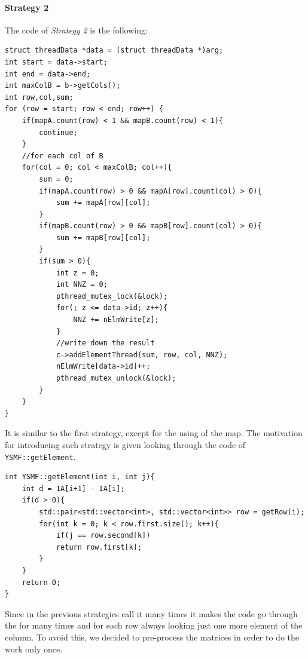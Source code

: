\documentclass[]{article}
\begin{document}
\paragraph{Strategy 2}
The code of \textit{Strategy 2} is the following:
\begin{lstlisting}[style=customc]
struct threadData *data = (struct threadData *)arg;
int start = data->start;
int end = data->end;
int maxColB = b->getCols();
int row,col,sum;
for (row = start; row < end; row++) {
    if(mapA.count(row) < 1 && mapB.count(row) < 1){
        continue;
    }
    //for each col of B
    for(col = 0; col < maxColB; col++){
        sum = 0;
        if(mapA.count(row) > 0 && mapA[row].count(col) > 0){
            sum += mapA[row][col];
        }
        if(mapB.count(row) > 0 && mapB[row].count(col) > 0){
            sum += mapB[row][col];
        }
        if(sum > 0){
            int z = 0;
            int NNZ = 0;
            pthread_mutex_lock(&lock);
            for(; z <= data->id; z++){
                NNZ += nElmWrite[z];
            }
            //write down the result
            c->addElementThread(sum, row, col, NNZ);
            nElmWrite[data->id]++;
            pthread_mutex_unlock(&lock);
        }
    }
}
\end{lstlisting}
It is similar to the first strategy, except for the using of the map.
The motivation for introducing such strategy is given looking through the code of \texttt{YSMF::getElement}.
\begin{lstlisting}[style=customc]
int YSMF::getElement(int i, int j){
    int d = IA[i+1] - IA[i];
    if(d > 0){
        std::pair<std::vector<int>, std::vector<int>> row = getRow(i);
        for(int k = 0; k < row.first.size(); k++){
            if(j == row.second[k])
            return row.first[k];
        }
    }
    return 0;
}
\end{lstlisting}
Since in the previous strategies call it many times it makes the code go through the for many times and for each row always looking just one more element of the column.
To avoid this, we decided to pre-process the matrices in order to do the work only once.

\newpage
\label{strategy:3}
\end{document}
